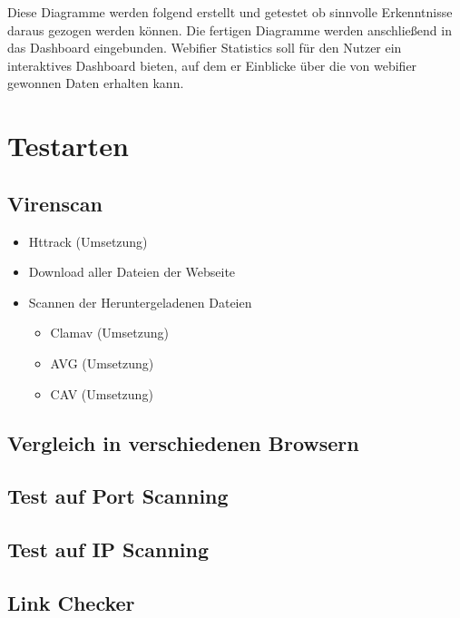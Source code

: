 Diese Diagramme werden folgend erstellt und getestet ob sinnvolle Erkenntnisse daraus gezogen werden können. Die fertigen Diagramme werden anschließend in das Dashboard eingebunden. Webifier Statistics soll für den Nutzer ein interaktives Dashboard bieten, auf dem er Einblicke über die von webifier gewonnen Daten erhalten kann.

\section{Testarten}

\subsection{Virenscan}


\begin{itemize}
  \item Httrack (Umsetzung)
  \item Download aller Dateien der Webseite
  \item Scannen der Heruntergeladenen Dateien
  \begin{itemize}
    \item Clamav (Umsetzung)
    \item AVG (Umsetzung)
    \item CAV (Umsetzung)
  \end{itemize}
\end{itemize}

\subsection{Vergleich in verschiedenen Browsern}


\subsection{Test auf Port Scanning}


\subsection{Test auf IP Scanning}


\subsection{Link Checker}

